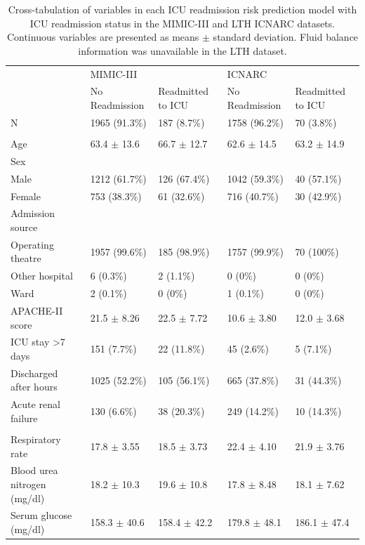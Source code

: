 \documentclass[onecolumn]{article}
\begin{document}
\begin{table}
\centering
	\renewcommand{\arraystretch}{1.4}
		\caption{Cross-tabulation of variables in each ICU readmission risk prediction model with ICU readmission status in the MIMIC-III and LTH ICNARC datasets. Continuous variables are presented as means $\pm$ standard deviation. Fluid balance information was unavailable in the LTH dataset.}
	\begin{tabular}{lp{2.5cm}p{3cm}p{2.5cm}p{3cm}}
		\hline
		& MIMIC-III & & ICNARC &\\
		& No Readmission & Readmitted to ICU & No Readmission & Readmitted to ICU\\
		\hline
		N & 1965 (91.3\%)  &    187 (8.7\%) & 1758 (96.2\%) & 70 (3.8\%)\\
		\cite{Frost2010} &&&&\\
		Age & 63.4 $\pm$ 13.6 & 66.7 $\pm$ 12.7 & 62.6 $\pm$ 14.5 &  63.2 $\pm$ 14.9 \\
		Sex &&\\
		\quad Male & 1212 (61.7\%)   &    126 (67.4\%) & 1042 (59.3\%) & 40 (57.1\%)\\
		\quad Female & 753 (38.3\%)  &     61 (32.6\%) & 716 (40.7\%) & 30 (42.9\%)\\
		Admission source &&\\
		\quad Operating theatre & 1957 (99.6\%)  &   185 (98.9\%) & 1757 (99.9\%) & 70 (100\%)\\
		\quad Other hospital & 6 (0.3\%)    &    2 (1.1\%) & 0 (0\%) & 0 (0\%)\\
		\quad Ward & 2 (0.1\%)   &     0 (0\%) & 1 (0.1\%) & 0 (0\%)\\
		APACHE-II score & 21.5 $\pm$ 8.26 & 22.5 $\pm$ 7.72 & 10.6 $\pm$ 3.80 & 12.0 $\pm$ 3.68 \\
		ICU stay >7 days & 151 (7.7\%)   &     22 (11.8\%) & 45 (2.6\%) & 5 (7.1\%)\\
		Discharged after hours & 1025 (52.2\%)    &   105 (56.1\%) & 665 (37.8\%) & 31 (44.3\%)\\
		Acute renal failure & 130 (6.6\%)   &    38 (20.3\%) & 249 (14.2\%) & 10 (14.3\%)\\
		\cite{Martin2018} &&&&\\%
		Respiratory rate & 17.8 $ \pm $ 3.55 & 18.5 $ \pm $ 3.73 & 22.4 $\pm$ 4.10 & 21.9 $\pm$ 3.76 \\
		Blood urea nitrogen (mg/dl) & 18.2 $ \pm $ 10.3 & 19.6 $ \pm $ 10.8& 17.8 $\pm$ 8.48 & 18.1 $\pm$ 7.62 \\
		Serum glucose (mg/dl) & 158.3 $ \pm $ 40.6 & 158.4 $ \pm $ 42.2& 179.8 $\pm$ 48.1 & 186.1 $\pm$ 47.4 \\

\end{tabular}
\end{table}
\end{document}
